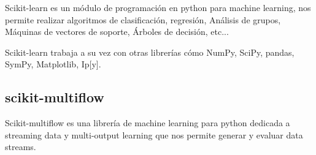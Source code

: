 Scikit-learn es un módulo de programación en python para machine learning, nos permite realizar algoritmos de clasificación, regresión, Análisis de grupos, Máquinas de vectores de soporte, Árboles de decisión, etc...

Scikit-learn trabaja a su vez con otras librerías cómo NumPy, SciPy, pandas, SymPy, Matplotlib, Ip[y].

\subsection{scikit-multiflow}

Scikit-multiflow es una librería de machine learning para python dedicada a streaming data y multi-output learning que nos permite generar y evaluar data streams.

